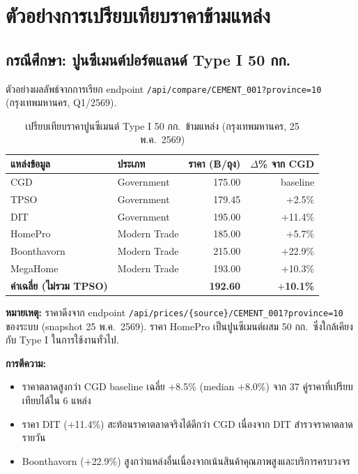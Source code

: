 \section{ตัวอย่างการเปรียบเทียบราคาข้ามแหล่ง}
\label{sec:cross-source}

\subsection{กรณีศึกษา: ปูนซีเมนต์ปอร์ตแลนด์ Type I 50 กก.}

ตัวอย่างผลลัพธ์จากการเรียก endpoint
\texttt{/api/compare/CEMENT\_001?province=10} (กรุงเทพมหานคร, Q1/2569).

\begin{table}[H]
\centering
\caption{เปรียบเทียบราคาปูนซีเมนต์ Type I 50 กก.\ ข้ามแหล่ง (กรุงเทพมหานคร, 25 พ.ค.\ 2569)}
\label{tab:cement-compare}
\begin{tabularx}{\textwidth}{l X r r}
\toprule
\textbf{แหล่งข้อมูล} & \textbf{ประเภท} & \textbf{ราคา (฿/ถุง)} & \textbf{$\Delta$\% จาก CGD} \\
\midrule
CGD         & Government   & 175.00 & baseline \\
TPSO        & Government   & 179.45 & $+$2.5\% \\
DIT         & Government   & 195.00 & $+$11.4\% \\
HomePro     & Modern Trade & 185.00 & $+$5.7\% \\
Boonthavorn & Modern Trade & 215.00 & $+$22.9\% \\
MegaHome    & Modern Trade & 193.00 & $+$10.3\% \\
\midrule
\textbf{ค่าเฉลี่ย (ไม่รวม TPSO)} & & \textbf{192.60} & \textbf{$+$10.1\%} \\
\bottomrule
\end{tabularx}
\end{table}

\textbf{หมายเหตุ:} ราคาดึงจาก endpoint \texttt{/api/prices/\{source\}/CEMENT\_001?province=10} ของระบบ (snapshot 25 พ.ค.\ 2569). ราคา HomePro เป็นปูนซีเมนต์ผสม 50 กก.\ ซึ่งใกล้เคียงกับ Type I ในการใช้งานทั่วไป.



\textbf{การตีความ:}
\begin{itemize}[leftmargin=2em]
  \item ราคาตลาดสูงกว่า CGD baseline เฉลี่ย $+$8.5\% (median $+$8.0\%) จาก 37 คู่ราคาที่เปรียบเทียบได้ใน 6 แหล่ง
  \item ราคา DIT ($+$11.4\%) สะท้อนราคาตลาดจริงได้ดีกว่า CGD เนื่องจาก DIT สำรวจราคาตลาดรายวัน
  \item Boonthavorn ($+$22.9\%) สูงกว่าแหล่งอื่นเนื่องจากเน้นสินค้าคุณภาพสูงและบริการครบวงจร
\end{itemize}

